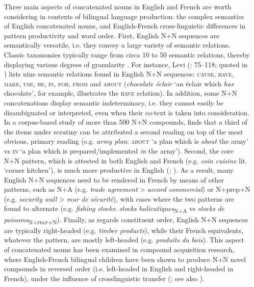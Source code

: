 \documentclass[output=paper]{langscibook}
\begin{document}
Three main aspects of concatenated nouns in English and French are worth considering in contexts of bilingual language production: the complex semantics of English concatenated nouns, and English-French cross-linguistic differences in pattern productivity and word order. First, English N+N sequences are semantically versatile, i.e. they convey a large variety of semantic relations. Classic taxonomies typically range from circa 10 to 50 semantic relations, thereby displaying various degrees of granularity \citep[82]{Fernandez-Dominguez2020}. For instance, Levi (\citeyear{Levi1978}: 75--118; quoted in \citealt{Fernandez-Dominguez2020}) lists nine semantic relations found in English N+N sequences: \textsc{cause}, \textsc{have}, \textsc{make}, \textsc{use}, \textsc{be}, \textsc{in}, \textsc{for}, \textsc{from} and \textsc{about} (\textit{chocolate éclair} ‘an éclair which \textit{has} chocolate’, for example, illustrates the \textsc{have} relation). In addition, some N+N concatenations display semantic indeterminacy, i.e. they cannot easily be disambiguated or interpreted, even when their co-text is taken into consideration. In a corpus-based study of more than 500 N+N compounds, \citet{Fernandez-Dominguez2020} finds that a third of the items under scrutiny can be attributed a second reading on top of the most obvious, primary reading (e.g. \textit{army plan}: \textsc{about} ‘a plan which is \textit{about} the army’ vs \textsc{in} ‘a plan which is prepared/implemented \textit{in} the army’). Second, the core N+N pattern, which is attested in both English and French (e.g. \textit{coin cuisine} lit. ‘corner kitchen’), is much more productive in English (\citealt[49--51]{Paillard2000}; \citealt{ArnaudRenner2014}). As a result, many English N+N sequences need to be rendered in French by means of other patterns, such as N+A (e.g. \textit{trade agreement} > \textit{accord commercial}) or N+prep+N (e.g. \textit{security wall} > \textit{mur de sécurité}), with cases where the two patterns are found to alternate (e.g. \textit{fishing stocks}: \textit{stocks halieutiques}\textsubscript{N+A} vs \textit{stocks de poissons}\textsc{\textsubscript{N+prep+N}}). Finally, as regards constituent order, English N+N sequences are typically right-headed (e.g. \textit{timber products}), while their French equivalents, whatever the pattern, are mostly left-headed (e.g. \textit{produits du bois}). This aspect of concatenated nouns has been examined in compound acquisition research, where English-French bilingual children have been shown to produce N+N novel compounds in reversed order (i.e. left-headed in English and right-headed in French), under the influence of crosslinguistic transfer (\citealt[cf.][]{Nicoladis2002}; see also \citealt{DeCatEtAl2015}).
\end{document}
